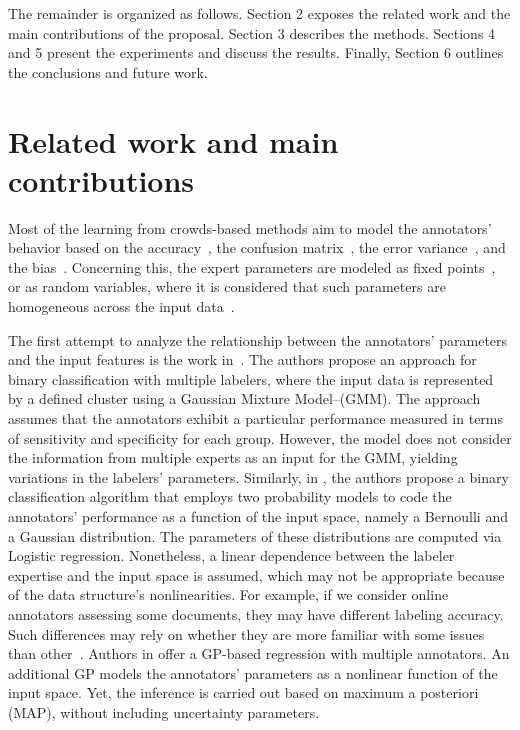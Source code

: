 \documentclass[journal]{IEEEtran}
\begin{document}
The remainder is organized as follows. Section 2 exposes the related
work and the main contributions of the proposal. Section 3 describes the
methods. Sections 4 and 5 present the experiments and discuss the
results. Finally, Section 6 outlines the conclusions and future work.

\section{Related work and main contributions}

Most of the learning from crowds-based methods aim to model the annotators' behavior based on the accuracy~\cite{rodrigues2013learning}, the confusion matrix~\cite{gonzalez2015automatic}, the error variance~\cite{raykar2010learning}, and the bias~\cite{rodrigues2017learning}. Concerning this, the expert parameters are modeled as fixed points~\cite{rodrigues2014gaussian}, or as random variables, where it is considered that such parameters are homogeneous across the input data~\cite{morales2019scalable}. 

The first attempt to analyze the relationship between the annotators' parameters and the input features is the work in~\cite{zhang2011learning}. The authors propose an approach for binary classification with multiple labelers, where the input data is represented by a defined cluster using a Gaussian Mixture Model--(GMM). The approach assumes that the annotators
exhibit a particular performance measured in terms of sensitivity and
specificity for each group. However, the model does not consider the information from multiple experts as an input for the GMM, yielding variations in the labelers' parameters. Similarly, in \cite{yan2014learning}, the authors propose a binary classification algorithm that employs two probability models to code the annotators' performance as a function of the input space, namely a
Bernoulli and a Gaussian distribution. The parameters of these
distributions are computed via Logistic regression. Nonetheless, a linear dependence between the labeler expertise and the input space is assumed, which may not be appropriate because of the data structure's nonlinearities. For example, if we consider online annotators assessing some documents, they may have different labeling accuracy. Such differences may rely on whether they are more familiar with some issues than other~\cite{wang2016bi}. Authors in \cite{xiao2013learning} offer a GP-based regression with multiple annotators. An additional GP models the annotators' parameters as a nonlinear function of the input space. Yet, the inference is carried out based on maximum a posteriori (MAP), without including uncertainty parameters.
\end{document}
